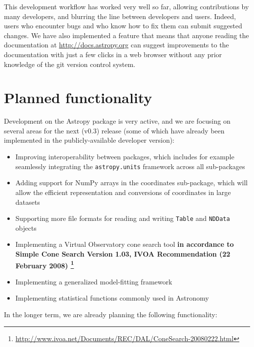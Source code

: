 \documentclass[traditabstract]{aa}
\begin{document}
This development workflow has worked very well so far, allowing contributions
by many developers, and blurring the line between developers and users. Indeed,
users who encounter bugs and who know how to fix them can submit suggested
changes. We have also implemented a feature that means that anyone reading the
documentation at \url{http://docs.astropy.org} can suggest improvements to the
documentation with just a few clicks in a web browser without any prior
knowledge of the git version control system.

\section{Planned functionality}

\label{sec:future}


Development on the Astropy package is very active, and we are focusing on several areas for
the next (v0.3) release (some of which have already been implemented in the
publicly-available developer version):

\begin{itemize}
\item Improving interoperability between packages, which includes for example seamlessly integrating the \texttt{astropy.units} framework across all sub-packages
\item Adding support for NumPy arrays in the coordinates sub-package, which will allow the efficient representation and conversions of coordinates in large datasets
\item Supporting more file formats for reading and writing \texttt{Table} and \texttt{NDData} objects
\item Implementing a Virtual Observatory cone search tool \textbf{in accordance to Simple Cone Search Version 1.03, IVOA Recommendation (22 February 2008) \footnote{\url{http://www.ivoa.net/Documents/REC/DAL/ConeSearch-20080222.html}}}
\item Implementing a generalized model-fitting framework
\item Implementing statistical functions commonly used in Astronomy
\end{itemize}

In the longer term, we are already planning the following functionality:
\end{document}
